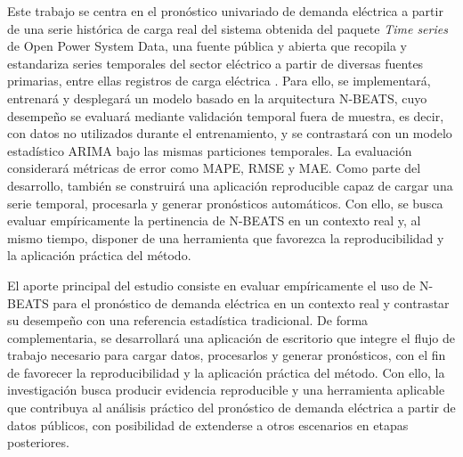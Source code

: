 Este trabajo se centra en el pronóstico univariado de demanda eléctrica a partir de una serie histórica de carga real del sistema obtenida del paquete \emph{Time series} de Open Power System Data, una fuente pública y abierta que recopila y estandariza series temporales del sector eléctrico a partir de diversas fuentes primarias, entre ellas registros de carga eléctrica \parencite{opsd2020timeseries}. Para ello, se implementará, entrenará y desplegará un modelo basado en la arquitectura N-BEATS, cuyo desempeño se evaluará mediante validación temporal fuera de muestra, es decir, con datos no utilizados durante el entrenamiento, y se contrastará con un modelo estadístico ARIMA bajo las mismas particiones temporales. La evaluación considerará métricas de error como MAPE, RMSE y MAE. Como parte del desarrollo, también se construirá una aplicación reproducible capaz de cargar una serie temporal, procesarla y generar pronósticos automáticos. Con ello, se busca evaluar empíricamente la pertinencia de N-BEATS en un contexto real y, al mismo tiempo, disponer de una herramienta que favorezca la reproducibilidad y la aplicación práctica del método.

El aporte principal del estudio consiste en evaluar empíricamente el uso de N-BEATS para el pronóstico de demanda eléctrica en un contexto real y contrastar su desempeño con una referencia estadística tradicional. De forma complementaria, se desarrollará una aplicación de escritorio que integre el flujo de trabajo necesario para cargar datos, procesarlos y generar pronósticos, con el fin de favorecer la reproducibilidad y la aplicación práctica del método. Con ello, la investigación busca producir evidencia reproducible y una herramienta aplicable que contribuya al análisis práctico del pronóstico de demanda eléctrica a partir de datos públicos, con posibilidad de extenderse a otros escenarios en etapas posteriores.
